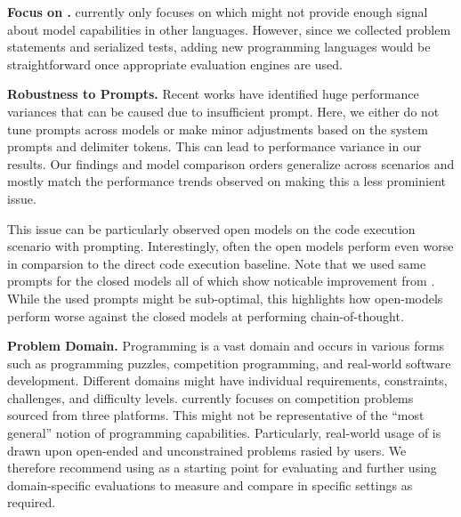 \vspace{1pt}
\noindent \textbf{Focus on \python{}.} 
\livecodebench{} currently only focuses on \python{} which might not provide enough signal about model capabilities in other languages. 
However, since we collected problem statements and serialized tests, adding new programming languages would be straightforward once appropriate evaluation engines are used.

\vspace{1pt}
\noindent \textbf{Robustness to Prompts.}
Recent works have identified huge performance variances that can be caused due to insufficient prompt.
Here, we either do not tune prompts across models or make minor adjustments based on the system prompts and delimiter tokens.
This can lead to performance variance in our results. 
Our findings and model comparison orders generalize across \livecodebench{} scenarios 
and mostly match the performance trends observed on \humaneval{} making this a less prominient issue.

This issue can be particularly observed open models on the code execution scenario with \chainot{} prompting.
Interestingly, often the open models perform even worse in comparsion to the direct code execution baseline.
Note that we used same prompts for the closed models all of which show noticable improvement from \chainot{}.
While the used prompts might be sub-optimal, this highlights how open-models perform worse against the closed models at performing chain-of-thought.

\vspace{1pt}
\noindent \textbf{Problem Domain.}
Programming is a vast domain and occurs in various forms such as programming puzzles, competition programming, and real-world software development.
Different domains might have individual requirements, constraints, challenges, and difficulty levels.
\livecodebench{} currently focuses on competition problems sourced from three platforms.
This might not be representative of the ``most general'' notion of \llm{} programming capabilities. 
Particularly, real-world usage of \llms{} is drawn upon open-ended and unconstrained problems rasied by users.
We therefore recommend using \livecodebench{} as a starting point for evaluating \llms{} and 
further using domain-specific evaluations to measure and compare \llms{} in specific settings as required.